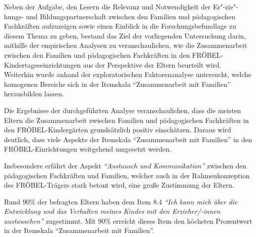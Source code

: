 \documentclass[12pt,a4paper]{article}
\begin{document}
Neben der Aufgabe, den Lesern die Relevanz und Notwendigkeit der Er"-zie"-hungs- und Bildungspartnerschaft zwischen den Familien und pädagogischen Fachkräften aufzuzeigen sowie einen Einblick in die Forschungsbefundlage zu diesem Thema zu geben, bestand das Ziel der vorliegenden Untersuchung darin, mithilfe der empirischen Analysen zu veranschaulichen, wie die Zusammenarbeit zwischen den Familien und pädagogischen Fachkräften in den FRÖBEL-Kindertageseinrichtungen aus der Perspektive der Eltern beurteilt wird.  Weiterhin wurde anhand der exploratorischen Faktorenanalyse untersucht, welche homogenen Bereiche sich in der Itemskala "`Zusammenarbeit mit Familien"' herausbilden  lassen.

	Die Ergebnisse der durchgeführten Analyse veranschaulichen, dass die meisten Eltern die Zusammenarbeit zwischen Familien und pädagogischen Fachkräften in den FRÖBEL-Kindergärten grundsätzlich positiv einschätzen. Daraus wird deutlich, dass viele Aspekte der Itemskala "`Zusammenarbeit mit Familien"' in den FRÖBEL-Einrichtungen weitgehend umgesetzt werden.
	
	Insbesondere erfährt der Aspekt \textit{"`Austausch und Kommunikation"'} zwischen den pädagogischen Fachkräften und Familien, welcher auch in der Rahmenkonzeption des FRÖBEL-Trägers stark betont wird, eine große Zustimmung der Eltern. 
	
Rund 90\% der befragten Eltern haben dem Item 8.4 \textit{"`Ich kann mich über die Entwicklung und das Verhalten meines Kindes mit den Erzieher/-innen austauschen"'} zugestimmt. Mit 90\% erreicht dieses Item den höchsten Prozentwert in der Itemskala "`Zusammenarbeit mit Familien"'. 
\end{document}
